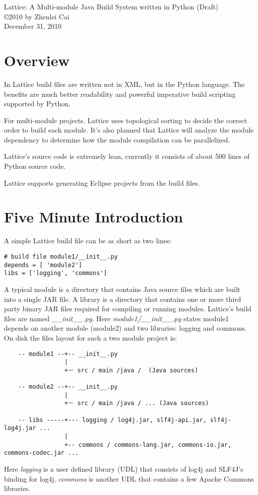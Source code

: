 \documentclass[12pt]{article}
\begin{document}
\begin{center}
{\large Lattice: A Multi-module Java Build System written in Python (Draft)} \\
\copyright 2010 by Zhenlei Cai \\
December 31, 2010
\end{center}

\section{Overview}
In Lattice build files are written not in XML, but in the Python
language. The benefits are much better readability and powerful
imperative build scripting supported by Python. 

For multi-module projects. Lattice uses topological sorting to decide
the correct order to build each module.  It's also planned that
Lattice will analyze the module
dependency to determine how the module compilation can be
parallelized.

Lattice's source code is extremely lean, currently it consists of
about 500 lines of Python source code.

Lattice supports generating Eclipse projects from the build files.


\section{Five Minute  Introduction}
A simple Lattice build file can be as short as two lines:

\begin{verbatim}
# build file module1/__init__.py
depends = [ 'module2']
libs = ['logging', 'commons']
\end{verbatim}

A typical module is a directory that contains Java source files which
are built into a single JAR file. A library is a directory that
contains one or more  third party binary JAR files required for
compiling or running modules. Lattice's build files are named {\it  \_\_init\_\_.py}. 
Here   {\it module1/\_\_init\_\_.py}  states module1 depends on another
module (module2) 
and two libraries: logging and commons.  On disk the files layout for such a two module project is:

\begin{verbatim}
    -- module1 --+-- __init__.py
                 |
                 +－ src / main /java /  (Java sources)

    -- module2 --+-- __init__.py
                 |
                 +－ src / main /java / ... (Java sources)

    -- libs -----+--- logging / log4j.jar, slf4j-api.jar, slf4j-log4j.jar ...
                 |
                 +-- commons / commons-lang.jar, commons-io.jar, commons-codec.jar ...
\end{verbatim}
Here {\it logging} is a user defined library (UDL) that consists of log4j and SLF4J's binding for log4j. {\it commons} is another  UDL that contains a few Apache Commons libraries. 
\end{document}
